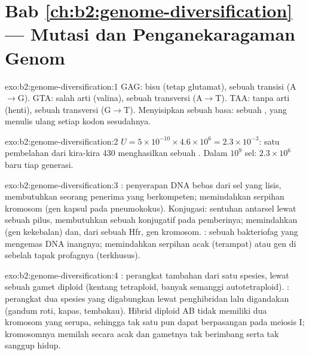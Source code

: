 \section*{Bab \ref{ch:b2:genome-diversification} --- Mutasi dan Penganekaragaman Genom}

\begin{solution}{exo:b2:genome-diversification:1}
GAG: bisu (tetap glutamat), sebuah transisi (A$\to$G). GTA: salah arti
(valina), sebuah transversi (A$\to$T). TAA: tanpa arti (henti), sebuah
transversi (G$\to$T). Menyisipkan sebuah basa: sebuah , yang menulis ulang setiap kodon sesudahnya.
\end{solution}

\begin{solution}{exo:b2:genome-diversification:2}
$U = 5\times 10^{-10}\times 4.6\times 10^{6} = 2.3\times 10^{-3}$: satu
pembelahan dari kira-kira 430 menghasilkan sebuah . Dalam
$10^{9}$ sel: $2.3\times 10^{6}$  baru tiap generasi.
\end{solution}

\begin{solution}{exo:b2:genome-diversification:3}
: penyerapan DNA bebas dari sel yang lisis, membutuhkan
seorang penerima yang berkompeten; memindahkan serpihan kromosom (gen
kapsul pada pneumokokus). Konjugasi: sentuhan antarsel lewat sebuah
pilus, membutuhkan sebuah  konjugatif pada pemberinya;
memindahkan  (gen kekebalan) dan, dari sebuah Hfr, gen
kromosom. : sebuah bakteriofag yang mengemas DNA inangnya;
memindahkan serpihan acak (terampat) atau gen di sebelah tapak
profagnya (terkhusus).
\end{solution}

\begin{solution}{exo:b2:genome-diversification:4}
: perangkat tambahan dari satu spesies, lewat sebuah gamet
diploid (kentang tetraploid, banyak semanggi autotetraploid).
: perangkat dua spesies yang digabungkan lewat penghibridan
lalu digandakan (gandum roti, kapas, tembakau). Hibrid diploid AB tidak
memiliki dua kromosom yang serupa, sehingga tak satu pun dapat
berpasangan pada meiosis I; kromosomnya memilah secara acak dan
gametnya tak berimbang serta tak sanggup hidup.
\end{solution}

